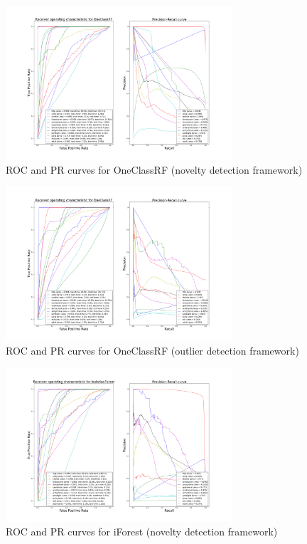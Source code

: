 \begin{figure}[!ht]
    \caption{\acs{ROC} and \acs{PR} curves for \acs{OneClassRF} (novelty
    detection framework)}
    \label{ocrf:fig:oneclassrf_roc_pr}
    \centering
    \includegraphics[trim=175 80 175 123, clip,
    width=0.75\textwidth]{./gfx/bench_oneclassrf_roc_pr_supervised_factorized.png}
\end{figure}
\begin{figure}[!ht]
    \caption{\acs{ROC} and \acs{PR} curves for \acs{OneClassRF} (outlier
    detection framework)}
    \label{ocrf:fig:oneclassrf_roc_pr_unsupervised}
    \centering
    \includegraphics[trim=175 80 175 123, clip,
    width=0.75\textwidth]{./gfx/bench_oneclassrf_roc_pr_unsupervised_factorized.png}
\end{figure}
\begin{figure}[!ht]
    \caption{\acs{ROC} and \acs{PR} curves for \acs{iForest} (novelty detection
    framework)}
    \label{ocrf:fig:iforest_roc_pr}
    \centering
    \includegraphics[trim=175 80 175 123, clip,
    width=0.75\textwidth]{./gfx/bench_iforest_roc_pr_supervised_factorized.png}
\end{figure}
